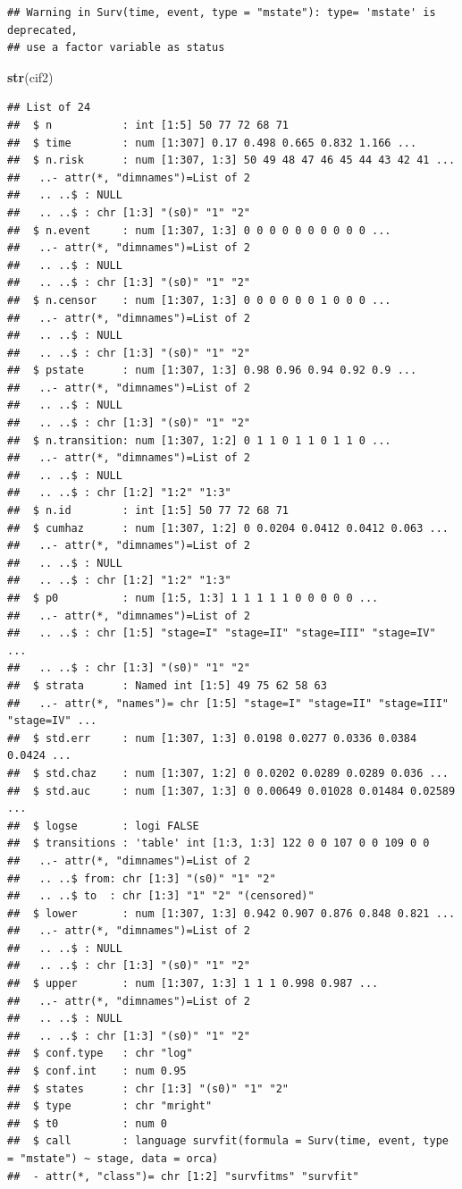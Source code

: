 \documentclass[
]{book}
\newenvironment{Shaded}{\begin{snugshade}}{\end{snugshade}}
\newcommand{\FunctionTok}[1]{\textcolor[rgb]{0.13,0.29,0.53}{\textbf{#1}}}
\newcommand{\NormalTok}[1]{#1}
\theoremstyle{definition}
\theoremstyle{definition}
\theoremstyle{definition}
\theoremstyle{definition}
\theoremstyle{remark}
\begin{document}
\begin{verbatim}
## Warning in Surv(time, event, type = "mstate"): type= 'mstate' is deprecated,
## use a factor variable as status
\end{verbatim}

\begin{Shaded}
\begin{Highlighting}[]
\FunctionTok{str}\NormalTok{(cif2)}
\end{Highlighting}
\end{Shaded}

\begin{verbatim}
## List of 24
##  $ n           : int [1:5] 50 77 72 68 71
##  $ time        : num [1:307] 0.17 0.498 0.665 0.832 1.166 ...
##  $ n.risk      : num [1:307, 1:3] 50 49 48 47 46 45 44 43 42 41 ...
##   ..- attr(*, "dimnames")=List of 2
##   .. ..$ : NULL
##   .. ..$ : chr [1:3] "(s0)" "1" "2"
##  $ n.event     : num [1:307, 1:3] 0 0 0 0 0 0 0 0 0 0 ...
##   ..- attr(*, "dimnames")=List of 2
##   .. ..$ : NULL
##   .. ..$ : chr [1:3] "(s0)" "1" "2"
##  $ n.censor    : num [1:307, 1:3] 0 0 0 0 0 0 1 0 0 0 ...
##   ..- attr(*, "dimnames")=List of 2
##   .. ..$ : NULL
##   .. ..$ : chr [1:3] "(s0)" "1" "2"
##  $ pstate      : num [1:307, 1:3] 0.98 0.96 0.94 0.92 0.9 ...
##   ..- attr(*, "dimnames")=List of 2
##   .. ..$ : NULL
##   .. ..$ : chr [1:3] "(s0)" "1" "2"
##  $ n.transition: num [1:307, 1:2] 0 1 1 0 1 1 0 1 1 0 ...
##   ..- attr(*, "dimnames")=List of 2
##   .. ..$ : NULL
##   .. ..$ : chr [1:2] "1:2" "1:3"
##  $ n.id        : int [1:5] 50 77 72 68 71
##  $ cumhaz      : num [1:307, 1:2] 0 0.0204 0.0412 0.0412 0.063 ...
##   ..- attr(*, "dimnames")=List of 2
##   .. ..$ : NULL
##   .. ..$ : chr [1:2] "1:2" "1:3"
##  $ p0          : num [1:5, 1:3] 1 1 1 1 1 0 0 0 0 0 ...
##   ..- attr(*, "dimnames")=List of 2
##   .. ..$ : chr [1:5] "stage=I" "stage=II" "stage=III" "stage=IV" ...
##   .. ..$ : chr [1:3] "(s0)" "1" "2"
##  $ strata      : Named int [1:5] 49 75 62 58 63
##   ..- attr(*, "names")= chr [1:5] "stage=I" "stage=II" "stage=III" "stage=IV" ...
##  $ std.err     : num [1:307, 1:3] 0.0198 0.0277 0.0336 0.0384 0.0424 ...
##  $ std.chaz    : num [1:307, 1:2] 0 0.0202 0.0289 0.0289 0.036 ...
##  $ std.auc     : num [1:307, 1:3] 0 0.00649 0.01028 0.01484 0.02589 ...
##  $ logse       : logi FALSE
##  $ transitions : 'table' int [1:3, 1:3] 122 0 0 107 0 0 109 0 0
##   ..- attr(*, "dimnames")=List of 2
##   .. ..$ from: chr [1:3] "(s0)" "1" "2"
##   .. ..$ to  : chr [1:3] "1" "2" "(censored)"
##  $ lower       : num [1:307, 1:3] 0.942 0.907 0.876 0.848 0.821 ...
##   ..- attr(*, "dimnames")=List of 2
##   .. ..$ : NULL
##   .. ..$ : chr [1:3] "(s0)" "1" "2"
##  $ upper       : num [1:307, 1:3] 1 1 1 0.998 0.987 ...
##   ..- attr(*, "dimnames")=List of 2
##   .. ..$ : NULL
##   .. ..$ : chr [1:3] "(s0)" "1" "2"
##  $ conf.type   : chr "log"
##  $ conf.int    : num 0.95
##  $ states      : chr [1:3] "(s0)" "1" "2"
##  $ type        : chr "mright"
##  $ t0          : num 0
##  $ call        : language survfit(formula = Surv(time, event, type = "mstate") ~ stage, data = orca)
##  - attr(*, "class")= chr [1:2] "survfitms" "survfit"
\end{verbatim}
\end{document}
